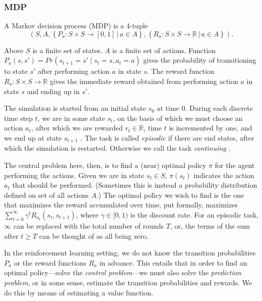 \documentclass{article} %
\newcommand{\setof}[1]{\ensuremath{\left \{ #1 \right \}}}
\begin{document}
\subsubsection{MDP}

A Markov decision process (MDP) \cite{book} is a 4-tuple
\begin{equation}
  (S, A, \setof{P_a : S \times S \rightarrow [0,1] \,|\, a \in A},
  \setof{R_a : S \times S \rightarrow \mathbb{R} \,|\, a \in A}).
\end{equation}

Above $S$ is a finite set of states. $A$ is a finite set of actions. Function
$P_a(s, s') = Pr(s_{t+1} = s' \;|\; s_t = s, a_t = a)$ gives the probability of
transitioning to state $s'$ after performing action $a$ in state $s$. The
reward function $R_a : S \times S \rightarrow \mathbb{R}$ gives the immediate
reward obtained from performing action $a$ in state $s$ and ending up in $s'$.

The simulation is started from an initial state $s_0$ at time 0. During each
discrete time step $t$, we are in some state $s_t$, on the basis of which we
must choose an action $a_t$, after which we are rewarded $r_t \in \mathbb{R}$,
time $t$ is incremented by one, and we end up at state $s_{t+1}$
\cite{abe2002empirical}. The task is called \emph{episodic} if there are end
states, after which the simulation is restarted. Otherwise we call the task
\emph{continuing} \cite{book}.

The central problem here, then, is to find a (near) optimal policy $\pi$ for
the agent performing the actions. Given we are in state $s_t \in S$, $\pi(s_t)$
indicates the action $a_t$ that should be performed. (Sometimes this is instead
a probability distribution defined on set of all actions $A$.) The optimal
policy we wish to find is the one that maximizes the reward accumulated over
time, put formally, maximizes $\sum_{t=0}^\infty \gamma^t R_{a_t}(s_t,
s_{t+1})$, where $\gamma \in [0,1)$ is the discount rate. For an episodic task,
$\infty$ can be replaced with the total number of rounds $T$, or, the terms of
the sum after $t \geq T$ can be thought of as all being zero.

In the reinforcement learning setting, we do not know the transition
probabilities $P_a$ or the reward functions $R_a$ in advance. This entails that
in order to find an optimal policy---solve the \emph{control problem}---we
must also solve the \emph{prediction problem}, or in some sense, estimate the
transition probabilities and rewards. We do this by means of estimating a value
function.
\end{document}
